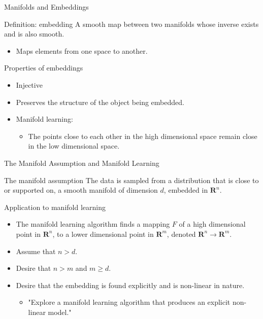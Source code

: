 \documentclass{beamer}
\begin{document}
\begin{frame}{Manifolds and Embeddings}
\begin{block}{Definition: embedding}
A smooth map between two manifolds whose inverse exists and is also smooth. 
\begin{itemize}
    \item Maps elements from one space to another.
\end{itemize}
\end{block}
\pause
\begin{block}{Properties of embeddings}
    \begin{itemize}
        \item Injective
        \item Preserves the structure of the object being embedded.
        \item Manifold learning:
        \begin{itemize}
            \item The points close to each other in the high dimensional space remain close in the low dimensional space. 
        \end{itemize}
    \end{itemize}
\end{block}
\end{frame}

\begin{frame}{The Manifold Assumption and Manifold Learning}
\begin{block}{The manifold assumption}
    The data is sampled from a distribution that is close to or supported on, a smooth manifold of dimension $d$, embedded in $\mathbf{R}^n$. 
\end{block}
\pause
\begin{block}{Application to manifold learning}
\begin{itemize}[<+->]
    \item The manifold learning algorithm finds a mapping $F$ of a high dimensional point in $\mathbf{R}^n$, to a lower dimensional point in $\mathbf{R}^m$, denoted $\mathbf{R}^n \rightarrow \mathbf{R}^m$.
    \item Assume that $n > d$.
    \item Desire that $n > m$ and $m \geq d$. 
    \item Desire that the embedding is found explicitly and is non-linear in nature.
    \begin{itemize}
        \item "Explore a manifold learning algorithm that produces an explicit non-linear model."
    \end{itemize}
\end{itemize}
\end{block}
\end{frame}
\end{document}
